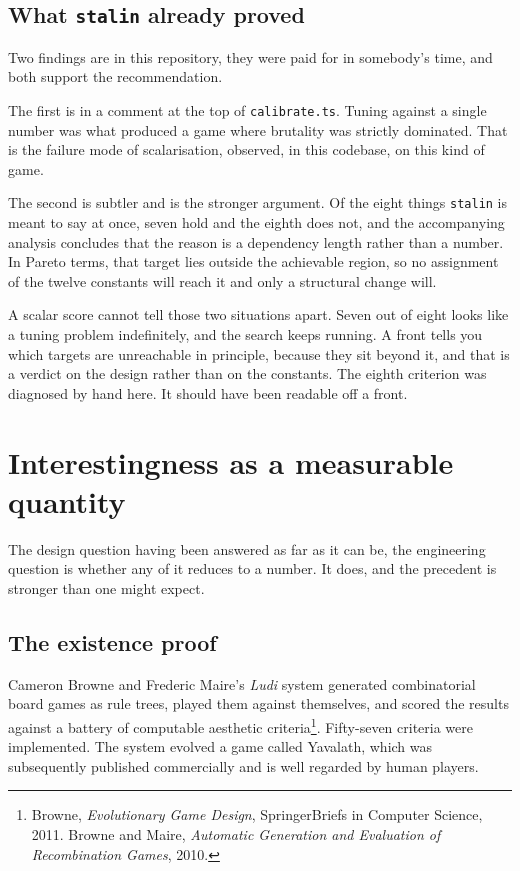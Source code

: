 \documentclass[11pt,a4paper]{article}
\begin{document}
\subsection{What \texttt{stalin} already proved}

Two findings are in this repository, they were paid for in somebody's time, and both support the
recommendation.

The first is in a comment at the top of \texttt{calibrate.ts}. Tuning against a single number was
what produced a game where brutality was strictly dominated. That is the failure mode of
scalarisation, observed, in this codebase, on this kind of game.

The second is subtler and is the stronger argument. Of the eight things \texttt{stalin} is meant
to say at once, seven hold and the eighth does not, and the accompanying analysis concludes that
the reason is a dependency length rather than a number. In Pareto terms, that target lies outside
the achievable region, so no assignment of the twelve constants will reach it and only a
structural change will.

\begin{alarmbox}
A scalar score cannot tell those two situations apart. Seven out of eight looks like a tuning
problem indefinitely, and the search keeps running. A front tells you which targets are
unreachable in principle, because they sit beyond it, and that is a verdict on the design rather
than on the constants. The eighth criterion was diagnosed by hand here. It should have been
readable off a front.
\end{alarmbox}

\section{Interestingness as a measurable quantity}
\label{sec:browne}

The design question having been answered as far as it can be, the engineering question is whether
any of it reduces to a number. It does, and the precedent is stronger than one might expect.

\subsection{The existence proof}

Cameron Browne and Frederic Maire's \emph{Ludi} system generated combinatorial board games as
rule trees, played them against themselves, and scored the results against a battery of
computable aesthetic criteria\footnote{Browne, \emph{Evolutionary Game Design}, SpringerBriefs in
Computer Science, 2011. Browne and Maire, \emph{Automatic Generation and Evaluation of
Recombination Games}, 2010.}. Fifty-seven criteria were implemented. The system evolved a game
called Yavalath, which was subsequently published commercially and is well regarded by human
players.
\end{document}
